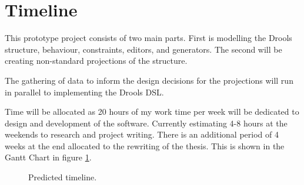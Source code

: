 \section{Timeline}

This prototype project consists of two main parts.
First is modelling the Drools structure, behaviour, constraints, editors, and generators.
The second will be creating non-standard projections of the structure.

The gathering of data to inform the design decisions for the projections will run in parallel to implementing the Drools DSL.

Time will be allocated as 20 hours of my work time per week will be dedicated to design and development of the software.
Currently estimating 4-8 hours at the weekends to research and project writing.
There is an additional period of 4 weeks at the end allocated to the rewriting of the thesis.
This is shown in the Gantt Chart in figure \ref{fig:ganttchart}.

\begin{figure}[H]
    \centering
    \caption{Predicted timeline.}
    \label{fig:ganttchart}
\end{figure}
